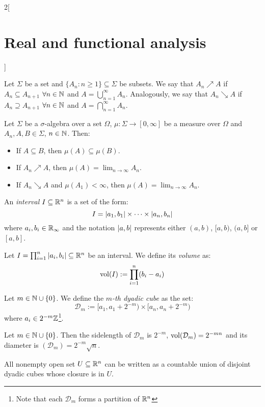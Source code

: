 \documentclass[../../../main.tex]{subfiles}
\begin{document}
\begin{multicols}{2}[\section{Real and functional analysis}]
\begin{definition}[Measure]
  \end{definition}
  \begin{definition}
    Let $\Sigma$ be a set and $\{A_n:n\geq1\}\subseteq\Sigma$ be subsets. We say that $A_n\nearrow A$ if $A_n\subseteq A_{n+1}$ $\forall n\in\mathbb{N}$ and $A=\bigcup_{n=1}^\infty A_n$. Analogously, we say that $A_n\searrow A$ if $A_n\supseteq A_{n+1}$ $\forall n\in\mathbb{N}$ and $A=\bigcap_{n=1}^\infty A_n$.
  \end{definition}
  \begin{proposition}
    Let $\Sigma$ be a $\sigma$-algebra over a set $\Omega$, $\mu:\Sigma\longrightarrow[0,\infty]$ be a measure over $\Omega$ and $A_n,A,B\in\Sigma$, $n\in\mathbb{N}$. Then:
    \begin{itemize}
      \item If $A\subseteq B$, then $\mu(A)\subseteq\mu(B)$.
      \item If $A_n\nearrow A$, then $\displaystyle\mu(A)=\lim_{n\to\infty} A_n$.
      \item If $A_n\searrow A$ and $\mu(A_1)<\infty$, then $\displaystyle\mu(A)=\lim_{n\to\infty} A_n$.
    \end{itemize}
  \end{proposition}
  \begin{definition}
    An \emph{interval} $I\subseteq\mathbb{R}^n$ is a set of the form:
    $$I=\abs{a_1,b_1}\times\cdots\times\abs{a_n,b_n}$$
    where $a_i,b_i\in\mathbb{R}_\infty$ and the notation $\abs{a,b}$ represents either $(a,b)$, $[a,b)$, $(a,b]$ or $[a,b]$.
  \end{definition}
  \begin{definition}
    Let $I=\prod_{i=1}^n\abs{a_i,b_i}\subseteq\mathbb{R}^n$ be an interval. We define its \emph{volume} as:
    $$\operatorname{vol}(I):=\prod_{i=1}^n(b_i-a_i)$$
  \end{definition}
  \begin{definition}
    Let $m\in\mathbb{N}\cup\{0\}$. We define the \emph{$m$-th dyadic cube} as the set: $$\mathcal{D}_m:=[a_1,a_1+2^{-m})\times [a_n,a_n+2^{-m})$$
    where $a_i\in 2^{-m}\mathbb{Z}$\footnote{Note that each $\mathcal{D}_m$ forms a partition of $\mathbb{R}^n$}.
  \end{definition}
  \begin{lemma}
    Let $m\in\mathbb{N}\cup\{0\}$. Then the sidelength of $\mathcal{D}_m$ is $2^{-m}$, $\operatorname{vol}(\mathcal{D}_m)= 2^{-mn}$ and its diameter is $(\mathcal{D}_m)= 2^{-m}\sqrt{n}$.
  \end{lemma}
  \begin{proposition}
    All nonempty open set $U\subseteq\mathbb{R}^n$ can be written as a countable union of disjoint dyadic cubes whose closure is in $U$.
  \end{proposition}

\end{multicols}
\end{document}
